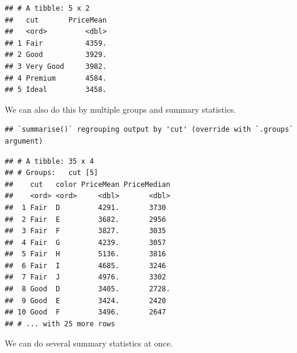 \documentclass[
]{book}
\newenvironment{Shaded}{\begin{snugshade}}{\end{snugshade}}
\newcommand{\DataTypeTok}[1]{\textcolor[rgb]{0.13,0.29,0.53}{#1}}
\newcommand{\KeywordTok}[1]{\textcolor[rgb]{0.13,0.29,0.53}{\textbf{#1}}}
\newcommand{\NormalTok}[1]{#1}
\newcommand{\OperatorTok}[1]{\textcolor[rgb]{0.81,0.36,0.00}{\textbf{#1}}}
\newcommand{\StringTok}[1]{\textcolor[rgb]{0.31,0.60,0.02}{#1}}
\begin{document}
\begin{verbatim}
## # A tibble: 5 x 2
##   cut       PriceMean
##   <ord>         <dbl>
## 1 Fair          4359.
## 2 Good          3929.
## 3 Very Good     3982.
## 4 Premium       4584.
## 5 Ideal         3458.
\end{verbatim}

We can also do this by multiple groups and summary statistics.

\begin{Shaded}
\end{Shaded}

\begin{verbatim}
## `summarise()` regrouping output by 'cut' (override with `.groups` argument)
\end{verbatim}

\begin{verbatim}
## # A tibble: 35 x 4
## # Groups:   cut [5]
##    cut   color PriceMean PriceMedian
##    <ord> <ord>     <dbl>       <dbl>
##  1 Fair  D         4291.       3730 
##  2 Fair  E         3682.       2956 
##  3 Fair  F         3827.       3035 
##  4 Fair  G         4239.       3057 
##  5 Fair  H         5136.       3816 
##  6 Fair  I         4685.       3246 
##  7 Fair  J         4976.       3302 
##  8 Good  D         3405.       2728.
##  9 Good  E         3424.       2420 
## 10 Good  F         3496.       2647 
## # ... with 25 more rows
\end{verbatim}

We can do several summary statistics at once.

\begin{Shaded}
\end{Shaded}
\end{document}
